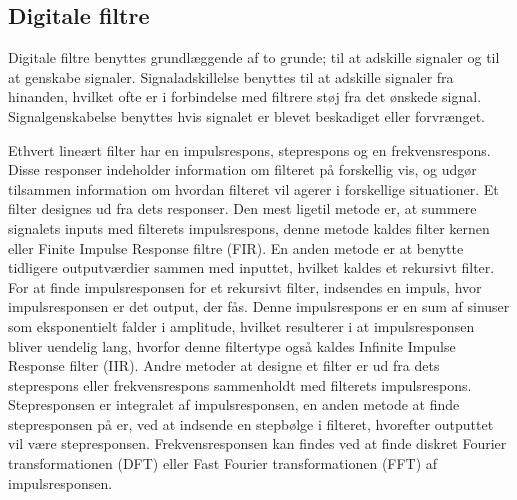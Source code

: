 \subsection{Digitale filtre}

Digitale filtre benyttes grundlæggende af to grunde; til at adskille signaler og til at genskabe signaler. 
Signaladskillelse benyttes til at adskille signaler fra hinanden, hvilket ofte er i forbindelse med filtrere støj fra det ønskede signal. 
Signalgenskabelse benyttes hvis signalet er blevet beskadiget eller forvrænget. \citep{Smith1997}

Ethvert lineært filter har en impulsrespons, steprespons og en frekvensrespons. Disse responser indeholder information om filteret på forskellig vis, og udgør tilsammen information om hvordan filteret vil agerer i forskellige situationer. \citep{Smith1997} \newline
Et filter designes ud fra dets responser. Den mest ligetil metode er, at summere signalets inputs med filterets impulsrespons, denne metode kaldes filter kernen eller Finite Impulse Response filtre (FIR). En anden metode er at benytte tidligere outputværdier sammen med inputtet, hvilket kaldes et rekursivt filter. For at finde impulsresponsen for et rekursivt filter, indsendes en impuls, hvor impulsresponsen er det output, der fås. Denne impulsrespons er en sum af sinuser som eksponentielt falder i amplitude, hvilket resulterer i at impulsresponsen bliver uendelig lang, hvorfor denne filtertype også kaldes Infinite Impulse Response filter (IIR). \citep{Smith1997,Blandford2013} \newline
Andre metoder at designe et filter er ud fra dets steprespons eller frekvensrespons sammenholdt med filterets impulsrespons. Stepresponsen er integralet af impulsresponsen, en anden metode at finde stepresponsen på er, ved at indsende en stepbølge i filteret, hvorefter outputtet vil være stepresponsen. Frekvensresponsen kan findes ved at finde diskret Fourier transformationen (DFT) eller Fast Fourier transformationen (FFT) af impulsresponsen. \citep{Smith1997}



